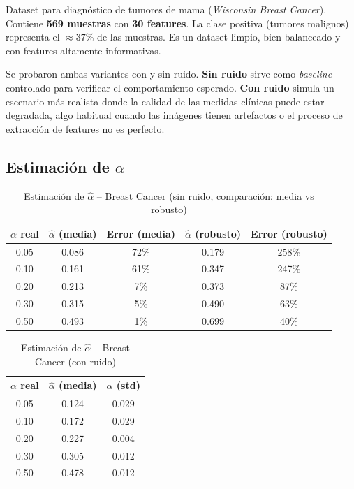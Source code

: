 \documentclass[a4paper,11pt]{article}
\begin{document}
Dataset para diagnóstico de tumores de mama (\textit{Wisconsin Breast Cancer}). Contiene \textbf{569 muestras} con \textbf{30 features}. La clase positiva (tumores malignos) representa el $\approx 37\%$ de las muestras. Es un dataset limpio, bien balanceado y con features altamente informativas.

Se probaron ambas variantes con y sin ruido. \textbf{Sin ruido} sirve como \textit{baseline} controlado para verificar el comportamiento esperado. \textbf{Con ruido} simula un escenario más realista donde la calidad de las medidas clínicas puede estar degradada, algo habitual cuando las imágenes tienen artefactos o el proceso de extracción de features no es perfecto.


\subsection{Estimación de $\alpha$}

\begin{table}[H]
\centering
\caption{Estimación de $\hat{\alpha}$ -- Breast Cancer (sin ruido, comparación: media vs robusto)}
\begin{tabular}{ccccc}
\toprule
$\alpha$ real & $\hat{\alpha}$ (media) & Error (media) & $\hat{\alpha}$ (robusto) & Error (robusto) \\
\midrule
0.05 & 0.086 & 72\% & 0.179 & 258\% \\
0.10 & 0.161 & 61\% & 0.347 & 247\% \\
0.20 & 0.213 & 7\% & 0.373 & 87\% \\
0.30 & 0.315 & 5\% & 0.490 & 63\% \\
0.50 & 0.493 & 1\% & 0.699 & 40\% \\
\bottomrule
\end{tabular}
\end{table}

\begin{table}[H]
\centering
\caption{Estimación de $\hat{\alpha}$ -- Breast Cancer (con ruido)}
\begin{tabular}{ccc}
\toprule
$\alpha$ real & $\hat{\alpha}$ (media) & $\hat{\alpha}$ (std) \\
\midrule
0.05 & 0.124 & 0.029 \\
0.10 & 0.172 & 0.029 \\
0.20 & 0.227 & 0.004 \\
0.30 & 0.305 & 0.012 \\
0.50 & 0.478 & 0.012 \\
\bottomrule
\end{tabular}
\end{table}
\end{document}
